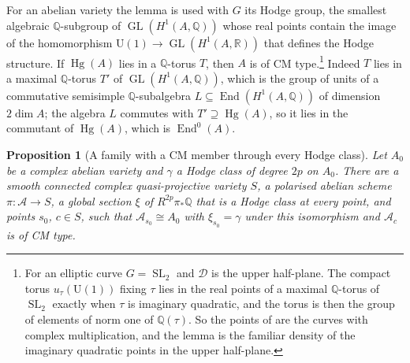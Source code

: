\documentclass[11pt,reqno]{amsart}
\theoremstyle{plain}
\newtheorem{proposition}[theorem]{Proposition}
\theoremstyle{definition}
\theoremstyle{remark}
\newcommand{\QQ}{\mathbb{Q}}
\newcommand{\RR}{\mathbb{R}}
\newcommand{\cA}{\mathcal{A}}
\newcommand{\cD}{\mathcal{D}}
\DeclareMathOperator{\End}{End}
\DeclareMathOperator{\Hg}{Hg}
\DeclareMathOperator{\GL}{GL}
\DeclareMathOperator{\SL}{SL}
\begin{document}
For an abelian variety the lemma is used with $G$ its Hodge group, the
smallest algebraic $\QQ$-subgroup of $\GL(H^{1}(A,\QQ))$ whose real points
contain the image of the homomorphism $\mathrm{U}(1)\to\GL(H^{1}(A,\RR))$
that defines the Hodge structure. If $\Hg(A)$ lies in a $\QQ$-torus $T$, then
$A$ is of CM type.\footnote{For an elliptic curve $G=\SL_{2}$ and $\cD$ is
the upper half-plane. The compact torus $u_{\tau}(\mathrm{U}(1))$ fixing
$\tau$ lies in the real points of a maximal $\QQ$-torus of $\SL_{2}$ exactly
when $\tau$ is imaginary quadratic, and the torus is then the group of
elements of norm one of $\QQ(\tau)$. So the points of 
are the curves with complex multiplication, and the lemma is the familiar
density of the imaginary quadratic points in the upper half-plane.} Indeed $T$ lies in a maximal $\QQ$-torus $T'$ of
$\GL(H^{1}(A,\QQ))$, which is the group of units of a commutative semisimple
$\QQ$-subalgebra $L\subseteq\End(H^{1}(A,\QQ))$ of dimension $2\dim A$; the
algebra $L$ commutes with $T'\supseteq\Hg(A)$, so it lies in the commutant of
$\Hg(A)$, which is $\End^{0}(A)$.

\begin{proposition}[A family with a CM member through every Hodge
class]\label{prop:cmfamily}
Let $A_{0}$ be a complex abelian variety and $\gamma$ a Hodge class of degree
$2p$ on $A_{0}$. There are a smooth connected complex quasi-projective variety
$S$, a polarised abelian scheme $\pi\colon\cA\to S$, a global section $\xi$ of
$R^{2p}\pi_{*}\QQ$ that is a Hodge class at every point, and points $s_{0}$,
$c\in S$, such that $\cA_{s_{0}}\cong A_{0}$ with $\xi_{s_{0}}=\gamma$ under
this isomorphism and $\cA_{c}$ is of CM type.
\end{proposition}
\end{document}
